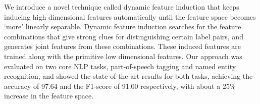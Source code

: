 We introduce a novel technique called dynamic feature induction that keeps inducing high dimensional features automatically until the feature space becomes ‘more' linearly separable. Dynamic feature induction searches for the feature combinations that give strong clues for distinguishing certain label pairs, and generates joint features from these combinations. These induced features are trained along with the primitive low dimensional features. Our approach was evaluated on two core NLP tasks, part-of-speech tagging and named entity recognition, and showed the state-of-the-art results for both tasks, achieving the accuracy of 97.64 and the F1-score of 91.00 respectively, with about a 25\% increase in the feature space.
